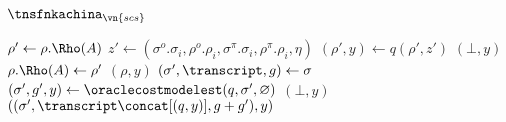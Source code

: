 \begin{transitionfn}{$\tnsfnkachina_{\vn{scs}}$}
\begin{helpers}
      \State \Let $\rho' \gets \rho.\Rho(A)$
      \State \Let $z' \gets (\sigma^o.\sigma_i, \rho^o.\rho_i,
        \sigma^\pi.\sigma_i, \rho^\pi.\rho_i, \eta)$
      \State \Let $(\rho', y) \gets q(\rho', z')$
        \Return $(\bot, y)$
      \Else
        \State \Let $\rho.\Rho(A) \gets \rho'$
        \State \Return $(\rho, y)$
      \EndIf
    \EndFunction
      \State \Let $(\sigma', \transcript, g) \gets \sigma$
      \State \Let $(\sigma', g', y) \gets \oraclecostmodelest(q, \sigma', \varnothing)$
        \Return $(\bot, y)$
      \Else
        \State \Return $((\sigma', \transcript \concat [(q, y)], g + g'), y)$
      \EndIf
    \EndFunction
  \end{helpers}
\end{transitionfn}

